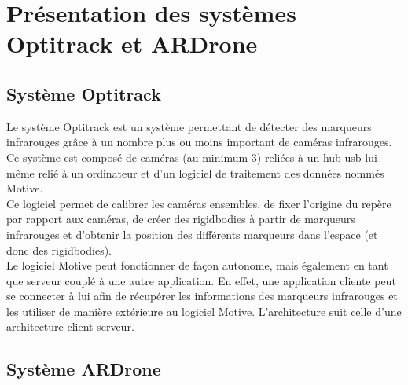 \chapter{Présentation des systèmes Optitrack et ARDrone}

    \section{Système Optitrack}
        Le système Optitrack est un système permettant de détecter des marqueurs infrarouges grâce à un nombre plus ou moins important de caméras infrarouges. Ce système est composé de caméras (au minimum 3) reliées à un hub usb lui-même relié à un ordinateur et d'un logiciel de traitement des données nommés Motive. \\

        Ce logiciel permet de calibrer les caméras ensembles, de fixer l'origine du repère par rapport aux caméras, de créer des rigidbodies à partir de marqueurs infrarouges et d'obtenir la position des différents marqueurs dans l'espace (et donc des rigidbodies). \\

        Le logiciel Motive peut fonctionner de façon autonome, mais également en tant que serveur couplé à une autre application. En effet, une application cliente peut se connecter à lui afin de récupérer les informations des marqueurs infrarouges et les utiliser de manière extérieure au logiciel Motive. L'architecture suit celle d'une architecture client-serveur.


    \section{Système ARDrone}

